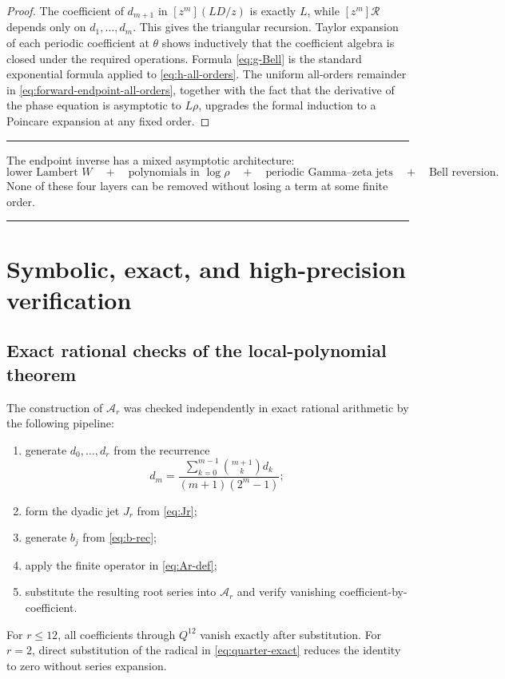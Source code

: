 \documentclass[11pt,oneside]{article}
\numberwithin{equation}{section}
\theoremstyle{definition}
\theoremstyle{remark}
\newenvironment{boxedremark}{%
  \par\smallskip\noindent\begin{center}\begin{minipage}{0.94\textwidth}%
  \color{black}\hrule\vspace{0.6em}\small
}{%
  \vspace{0.6em}\hrule\end{minipage}\end{center}\smallskip
}
\begin{document}
\begin{proof}
The coefficient of $d_{m+1}$ in $[z^m](L D/z)$ is exactly $L$, while
$[z^m]\mathcal R$ depends only on $d_1,\ldots,d_m$.  This gives the triangular
recursion.  Taylor expansion of each periodic coefficient at $\theta$ shows inductively
that the coefficient algebra is closed under the required operations.  Formula
\eqref{eq:g-Bell} is the standard exponential formula applied to
\eqref{eq:h-all-orders}.  The uniform all-orders remainder in
\eqref{eq:forward-endpoint-all-orders}, together with the fact that the derivative of the
phase equation is asymptotic to $L\rho$, upgrades the formal induction to a Poincare
expansion at any fixed order.
\end{proof}

\begin{boxedremark}
The endpoint inverse has a mixed asymptotic architecture:
\[
 \text{lower Lambert }W
 \quad+\quad \text{polynomials in }\log\rho
 \quad+\quad \text{periodic Gamma--zeta jets}
 \quad+\quad \text{Bell reversion}.
\]
None of these four layers can be removed without losing a term at some finite order.
\end{boxedremark}

\section{Symbolic, exact, and high-precision verification}
\label{sec:verification}

\subsection{Exact rational checks of the local-polynomial theorem}

The construction of $\mathcal A_r$ was checked independently in exact rational
arithmetic by the following pipeline:
\begin{enumerate}
 \item generate $d_0,\ldots,d_r$ from the recurrence
 \begin{equation}
 d_m=\frac{\sum_{k=0}^{m-1}\binom{m+1}{k}d_k}
 {(m+1)(2^m-1)};
 \label{eq:d-recurrence-check}
 \end{equation}
 \item form the dyadic jet $J_r$ from \eqref{eq:Jr};
 \item generate $b_j$ from \eqref{eq:b-rec};
 \item apply the finite operator in \eqref{eq:Ar-def};
 \item substitute the resulting root series into $\mathcal A_r$ and verify vanishing
 coefficient-by-coefficient.
\end{enumerate}
For $r\le12$, all coefficients through $Q^{12}$ vanish exactly after substitution.
For $r=2$, direct substitution of the radical in \eqref{eq:quarter-exact} reduces the
identity to zero without series expansion.
\end{document}
